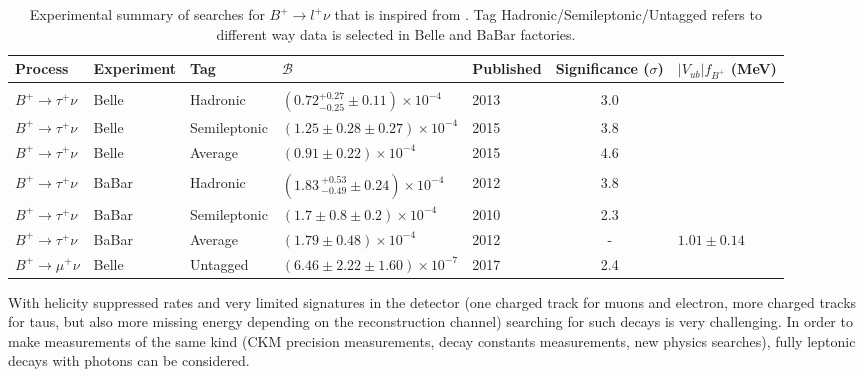 \begin{table}[ht]
\begin{center}
\begin{tabular}{ l l l l H c H} \toprule
        Process &Experiment & Tag &${\mathcal{B}}$ & Published & Significance ($\sigma$) & {$|V_{ub}|f_{B^+}$ (MeV)} \hfill\\
\hline\\[-2.5ex]
        $B^{+}\rightarrow \tau^{+}\nu$  &Belle~\cite{Adachi:2012mm}&Hadronic&$(0.72^{+0.27}_{-0.25}\pm0.11)\times10^{-4}$  & 2013 & 3.0 \\
        $B^{+}\rightarrow \tau^{+}\nu$  &Belle~\cite{Kronenbitter:2015kls}&Semileptonic&$(1.25\pm0.28\pm0.27)\times10^{-4}$ & 2015 & 3.8 \\
        $B^{+}\rightarrow \tau^{+}\nu$  &Belle~\cite{Kronenbitter:2015kls}&Average&$(0.91 \pm 0.22)\times10^{-4}$ & 2015 & 4.6 \\\hline\\[-2.5ex]
        $B^{+}\rightarrow \tau^{+}\nu$  &BaBar~\cite{Lees:2012ju} & Hadronic & $(1.83\,^{+0.53}_{-0.49}\pm0.24)\times10^{-4}$ & 2012 & 3.8 \\
        $B^{+}\rightarrow \tau^{+}\nu$  &BaBar~\cite{Aubert:2009wt} & Semileptonic & $(1.7\pm 0.8\pm 0.2)\times10^{-4}$ & 2010 & 2.3\\
        $B^{+}\rightarrow \tau^{+}\nu$  &BaBar~\cite{Lees:2012ju} & Average & $(1.79 \pm 0.48)\times 10^{-4}$ & 2012 & - & $1.01\pm 0.14$  \\ \hline
$B^{+}\rightarrow \mu^{+}\nu$ & Belle~\cite{Sibidanov:2017vph} & Untagged& $(6.46\pm2.22\pm 1.60)\times 10^{-7}$ & 2017 & 2.4 &\\
\bottomrule
\end{tabular}
\end{center}
\caption{Experimental summary of searches for $B^{+}\rightarrow l^{+}\nu$ that is inspired from \cite{Patrignani:2016xqp}. Tag Hadronic/Semileptonic/Untagged refers to different way data is selected in Belle and BaBar factories.}
\label{tab:sum}
\end{table}




With helicity suppressed rates and very limited signatures in the detector (one charged track for muons and electron, more charged tracks for taus, but also more missing energy depending on the reconstruction channel) searching for such decays is very challenging. In order to make measurements of the same kind (CKM precision measurements, decay constants measurements, new physics searches), fully leptonic decays with photons can be considered.   

